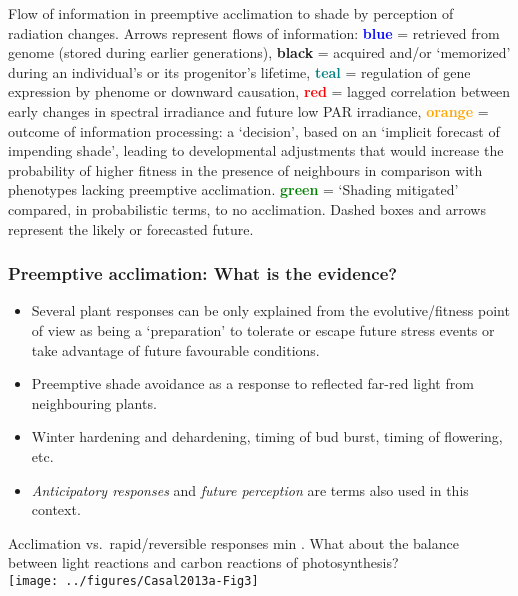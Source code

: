 \documentclass[10pt]{beamer}\usepackage[]{graphicx}\usepackage[]{color}
\begin{document}
\begin{frame}
{\tiny Flow of information in preemptive acclimation to shade by perception of radiation changes. Arrows represent flows of information: \textcolor{blue}{\textbf{blue}} = retrieved from genome (stored during earlier generations), \textbf{black} = acquired and/or `memorized' during an individual's or its progenitor's lifetime, \textcolor{teal}{\textbf{teal}} = regulation of gene expression by phenome or downward causation, \textcolor{red}{\textbf{red}} = lagged correlation between early changes in spectral irradiance and future low PAR irradiance, \textcolor{orange}{\textbf{orange}} = outcome of information processing: a `decision', based on an `implicit forecast of impending shade', leading to developmental adjustments that would increase the probability of higher fitness in the presence of neighbours in comparison with phenotypes lacking preemptive acclimation. \textcolor{green}{\textbf{green}} = `Shading mitigated' compared, in probabilistic terms, to no acclimation. Dashed boxes and arrows represent the likely or forecasted future.}
\end{frame}

\begin{frame}
  \frametitle{Preemptive acclimation: What is the evidence?}
  \begin{itemize}
    \item Several plant responses can be only explained from the evolutive/fitness point of view as being a `preparation' to tolerate or escape future stress events or take advantage of future favourable conditions.
    \item Preemptive shade avoidance as a response to reflected far-red light from neighbouring plants.
    \item Winter hardening and dehardening, timing of bud burst, timing of flowering, etc.
    \item \emph{Anticipatory responses} and \emph{future perception} are terms also used in this context.
  \end{itemize}
\end{frame}

\begin{frame}{Acclimation vs.\ rapid/reversible responses  min}{}
    {\footnotesize \autocite[from][]{Casal2013a}. What about the balance between light reactions and carbon reactions of photosynthesis?\\}
    \texttt{[image: ../figures/Casal2013a-Fig3]}
\end{frame}
\end{document}
